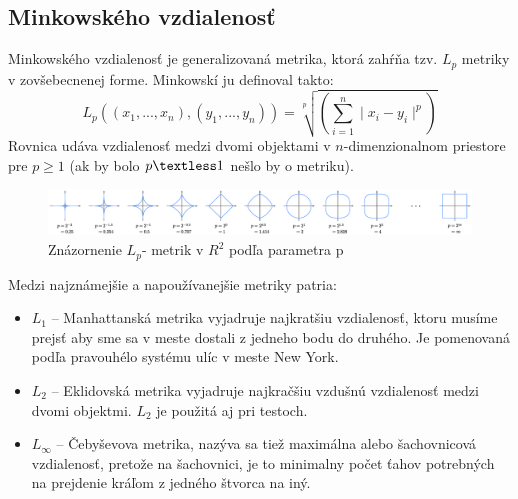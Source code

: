 \documentclass[12pt,oneside]{fithesis2}
\begin{document}
\subsection{Minkowského vzdialenosť}
Minkowského vzdialenosť je generalizovaná metrika, ktorá zahŕňa tzv. $L_p$ metriky v zovšebecnenej forme. Minkowskí ju definoval takto: 
\begin{equation*}
L_p((x_1,...,x_n),(y_1,...,y_n))=\sqrt[p]{\left(\sum\limits_{i=1}^n \mid x_i-y_i \mid^p \right)}
\end{equation*}
Rovnica udáva vzdialenosť medzi dvomi objektami v $n$-dimenzionalnom priestore pre $p\geq 1$ (ak by bolo $p \textless 1$ nešlo by o metriku). \cite{Zezula2} \\
	\begin{figure}
  		\centering
  		\includegraphics[width=14cm]{obr/lp.eps}
  		\caption{Znázornenie $L_p$- metrik v $R^2$ podľa parametra p}
	\end{figure}  

Medzi najznámejšie a napoužívanejšie metriky patria:
\begin{itemize}
\item $L_1$ -- Manhattanská metrika vyjadruje najkratšiu vzdialenosť, ktoru musíme prejsť aby sme sa v meste dostali z jedneho bodu do druhého. Je pomenovaná podľa pravouhélo systému ulíc v meste New York.
\item $L_2$ -- Eklidovská metrika vyjadruje najkračšiu vzdušnú vzdialenosť medzi dvomi objektmi. $L_2$ je použitá aj pri testoch.
\item $L_\infty $ -- Čebyševova metrika, nazýva sa tiež maximálna alebo šachovnicová vzdialenosť, pretože na šachovnici, je to minimalny počet ťahov potrebných na prejdenie kráľom z jedného štvorca na iný.
\end{itemize}
\end{document}
